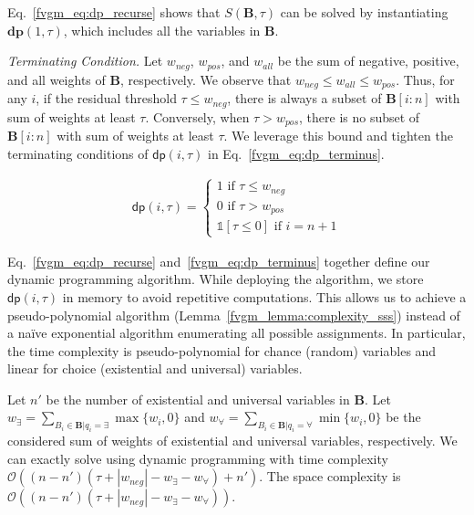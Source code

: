 Eq.~\eqref{fvgm_eq:dp_recurse} shows that $ S(\mathbf{B},\tau) $ can be solved by instantiating $ \mathbf{dp}(1, \tau) $, which includes all the variables in $ \mathbf{B} $. 

\textit{Terminating Condition.} %
Let $ w_{neg} $, $ w_{pos} $, and $ w_{all} $ be the sum of negative, positive, and all weights of $ \mathbf{B} $, respectively. We observe that $ w_{neg} \le w_{all} \le w_{pos}$. Thus, for any $ i $, if the {residual} threshold $ \tau \le w_{neg}$, there is always a subset of $ \mathbf{B}[i:n] $ with sum of weights at least $ \tau $. Conversely, when $ \tau > w_{pos}$, there is no subset of $ \mathbf{B}[i:n] $ with sum of weights at least $ \tau $.	We leverage this bound and tighten the terminating conditions of $ \mathsf{dp}(i, \tau) $ in Eq.~\eqref{fvgm_eq:dp_terminus}. 

\begin{align}\label{fvgm_eq:dp_terminus}
 \mathsf{dp}(i, \tau) =
 \begin{cases}
 1\text{ if }\tau \le w_{neg}\\
 0\text{ if } \tau > w_{pos}\\
 \mathds{1}[\tau \le 0] \text{ if } i=n + 1
 \end{cases} 
\end{align}

Eq.~\eqref{fvgm_eq:dp_recurse} and~\eqref{fvgm_eq:dp_terminus} together define our dynamic programming algorithm. While deploying the algorithm, we store $ \mathsf{dp}(i, \tau) $ in memory to avoid repetitive computations.  This allows us to achieve a pseudo-polynomial algorithm (Lemma~\ref{fvgm_lemma:complexity_sss}) instead of a na\"ive exponential algorithm enumerating all possible assignments. In particular, the time complexity is pseudo-polynomial for chance (random) variables and linear for choice (existential and universal) variables.
 
\begin{lemma}\label{fvgm_lemma:complexity_sss}
 	Let $ n' $ be the number of existential and universal variables in $ \mathbf{B} $. Let $ w_{\exists} = \sum_{B_i \in \mathbf{B} | q_i = \exists} \max\{w_i, 0\}$  and $ w_{\forall} = \sum_{B_i \in \mathbf{B} | q_i = \forall} \min\{w_i, 0\}$ be the considered sum of weights of existential and universal variables, respectively. We can exactly solve {\stochastic} using dynamic programming with time complexity $ \mathcal{O}((n - n')(\tau + |w_{neg}| - w_{\exists} - w_{\forall}) + n') $. The space complexity is  $ \mathcal{O}((n - n')(\tau + |w_{neg}| - w_{\exists} - w_{\forall})) $.
\end{lemma}
 


